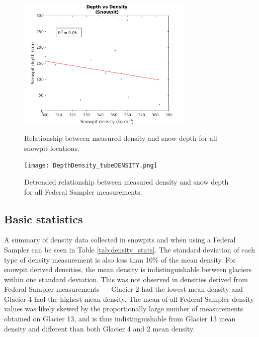 \documentclass[12pt]{article}
\begin{document}
\begin{figure} 
	\centering
	\includegraphics[width = 0.75\textwidth]{DepthDensity_SP.png}\\
	\caption{Relationship between measured density and snow depth for all snowpit locations.}
	\label{fig:pit_depth}
\end{figure}

\begin{figure} 
	\centering
	\texttt{[image: DepthDensity\_tubeDENSITY.png]}\\
	\caption{Detrended relationship between measured density and snow depth for all Federal Sampler measurements.}
	\label{fig:tube_depthDETREND}
\end{figure}


\subsection*{Basic statistics}

A summary of density data collected in snowpits and when using a Federal Sampler can be seen in Table \ref{tab:density_stats}. The standard deviation of each type of density measurement is also less than 10\% of the mean density. For snowpit derived densities, the mean density is indistinguishable between glaciers within one standard deviation. This was not observed in densities derived from Federal Sampler measurements --- Glacier 2 had the lowest mean density and Glacier 4 had the highest mean density. The mean of all Federal Sampler density values was likely skewed by the proportionally large number of measurements obtained on Glacier 13, and is thus indistinguishable from Glacier 13 mean density and different than both Glacier 4 and 2 mean density. 
\end{document}
